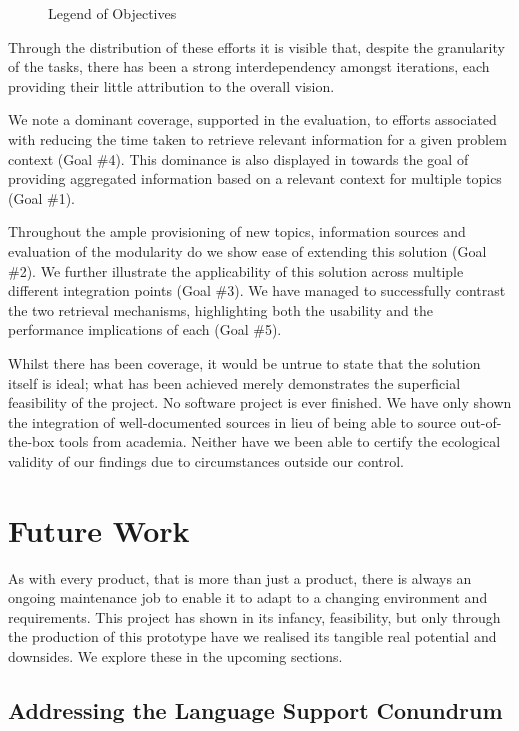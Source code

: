 \begin{figure}[h!]
	\small
	\printGoals
	\caption{Legend of Objectives}
\end{figure}

Through the distribution of these efforts it is visible that, despite the granularity of the tasks, there has been a strong interdependency amongst iterations, each providing their little attribution to the overall vision. 

We note a dominant coverage, supported in the evaluation, to efforts associated with reducing the time taken to retrieve relevant information for a given problem context (Goal \#4). This dominance is also displayed in towards the goal of providing aggregated information based on a relevant context for multiple topics (Goal \#1). 

Throughout the ample provisioning of new topics, information sources and evaluation of the modularity do we show ease of extending this solution (Goal \#2). We further illustrate the applicability of this solution across multiple different integration points (Goal \#3). We have managed to successfully contrast the two retrieval mechanisms, highlighting both the usability and the performance implications of each (Goal \#5).

Whilst there has been coverage, it would be untrue to state that the solution itself is ideal; what has been achieved merely demonstrates the superficial feasibility of the project. No software project is ever finished. We have only shown the integration of well-documented sources in lieu of being able to source out-of-the-box tools from academia. Neither have we been able to certify the ecological validity of our findings due to circumstances outside our control.

\section{Future Work}

As with every product, that is more than just a product, there is always an ongoing maintenance job to enable it to adapt to a changing environment and requirements. This project has shown in its infancy, feasibility, but only through the production of this prototype have we realised its tangible real potential and downsides. We explore these in the upcoming sections.

\subsection{Addressing the Language Support Conundrum}

